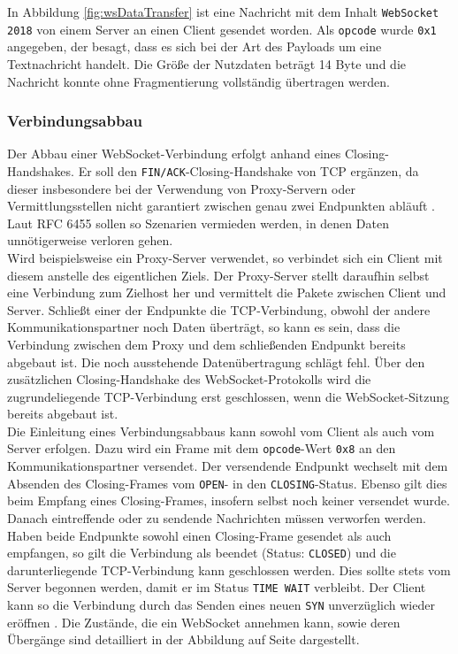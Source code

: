 \documentclass[11pt,a4paper,titlepage]{scrartcl}
\numberwithin{equation}{section}
\begin{document}
\noindent In Abbildung \ref{fig:wsDataTransfer} ist eine Nachricht mit dem Inhalt \texttt{WebSocket 2018} von einem Server an einen Client gesendet worden. Als \texttt{opcode} wurde \texttt{0x1} angegeben, der besagt, dass es sich bei der Art des Payloads um eine Textnachricht handelt. Die Größe der Nutzdaten beträgt 14 Byte und die Nachricht konnte ohne Fragmentierung vollständig übertragen werden.

\subsubsection{Verbindungsabbau}\label{subsubsec:wsClose}
Der Abbau einer WebSocket-Verbindung erfolgt anhand eines Closing-Handshakes. Er soll den \texttt{FIN/ACK}-Closing-Handshake von TCP ergänzen, da dieser insbesondere bei der Verwendung von Proxy-Servern oder Vermittlungsstellen nicht garantiert zwischen genau zwei Endpunkten abläuft \autocite[9]{fette_websocket_2011}. Laut RFC 6455 sollen so Szenarien vermieden werden, in denen Daten unnötigerweise verloren gehen. \\

\noindent Wird beispielsweise ein Proxy-Server verwendet, so verbindet sich ein Client mit diesem anstelle des eigentlichen Ziels. Der Proxy-Server stellt daraufhin selbst eine Verbindung zum Zielhost her und vermittelt die Pakete zwischen Client und Server. Schließt einer der Endpunkte die TCP-Verbindung, obwohl der andere Kommunikationspartner noch Daten überträgt, so kann es sein, dass die Verbindung zwischen dem Proxy und dem schließenden Endpunkt bereits abgebaut ist. Die noch ausstehende Datenübertragung schlägt fehl. Über den zusätzlichen Closing-Handshake des WebSocket-Protokolls wird die zugrundeliegende TCP-Verbindung erst geschlossen, wenn die WebSocket-Sitzung bereits abgebaut ist.\\

\noindent Die Einleitung eines Verbindungsabbaus kann sowohl vom Client als auch vom Server erfolgen. Dazu wird ein Frame mit dem \texttt{opcode}-Wert \texttt{0x8} an den Kommunikationspartner versendet. Der versendende Endpunkt wechselt mit dem Absenden des Closing-Frames vom \texttt{OPEN}- in den \texttt{CLOSING}-Status. Ebenso gilt dies beim Empfang eines Closing-Frames, insofern selbst noch keiner versendet wurde. Danach eintreffende oder zu sendende Nachrichten müssen verworfen werden. Haben beide Endpunkte sowohl einen Closing-Frame gesendet als auch empfangen, so gilt die Verbindung als beendet (Status: \texttt{CLOSED}) und die darunterliegende TCP-Verbindung kann geschlossen werden. Dies sollte stets vom Server begonnen werden, damit er im Status \texttt{TIME WAIT} verbleibt. Der Client kann so die Verbindung durch das Senden eines neuen \texttt{SYN} unverzüglich wieder eröffnen \autocite[41]{fette_websocket_2011}. Die Zustände, die ein WebSocket annehmen kann, sowie deren Übergänge sind detailliert in der Abbildung auf Seite \pageref{fig:wsLifeCycle} dargestellt. \\
\end{document}
